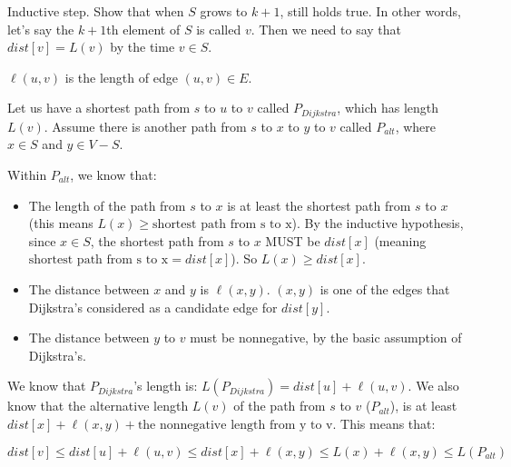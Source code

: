 \documentclass{article}
\begin{document}
Inductive step. Show that when $S$ grows to $k + 1$, still holds true. In other words, let's say the $k + 1$th element of $S$ is called $v$. Then we need to say that $dist[v] = L(v)$ by the time $v \in S$.

$\ell(u, v)$ is the length of edge $(u, v) \in E$.


Let us have a shortest path from $s$ to $u$ to $v$ called $P_{Dijkstra}$, which has length $L(v)$. Assume there is another path from $s$ to $x$ to $y$ to $v$ called $P_{alt}$, where $x \in S$ and $y \in V - S$.

Within $P_{alt}$, we know that:
\begin{itemize}
    \item The length of the path from $s$ to $x$ is at least the shortest path from $s$ to $x$ (this means $L(x) \geq \textrm{shortest path from s to x}$). By the inductive hypothesis, since $x \in S$, the shortest path from $s$ to $x$ MUST be $dist[x]$ (meaning $\textrm{shortest path from s to x} = dist[x]$). So $L(x) \geq dist[x]$.
    \item The distance between $x$ and $y$ is $\ell(x, y)$. $(x, y)$ is one of the edges that Dijkstra's considered as a candidate edge for $dist[y]$.
    \item The distance between $y$ to $v$ must be nonnegative, by the basic assumption of Dijkstra's.
\end{itemize}

We know that $P_{Dijkstra}$'s length is: $L(P_{Dijkstra}) = dist[u] + \ell(u, v)$. We also know that the alternative length $L(v)$ of the path from $s$ to $v$ ($P_{alt}$), is at least $dist[x] + \ell(x, y) + \textrm{the nonnegative length from y to v}$. This means that:

$$dist[v] \leq dist[u] + \ell(u, v) \leq dist[x] + \ell(x, y) \leq L(x) + \ell(x, y) \leq L(P_{alt})$$
\end{document}
